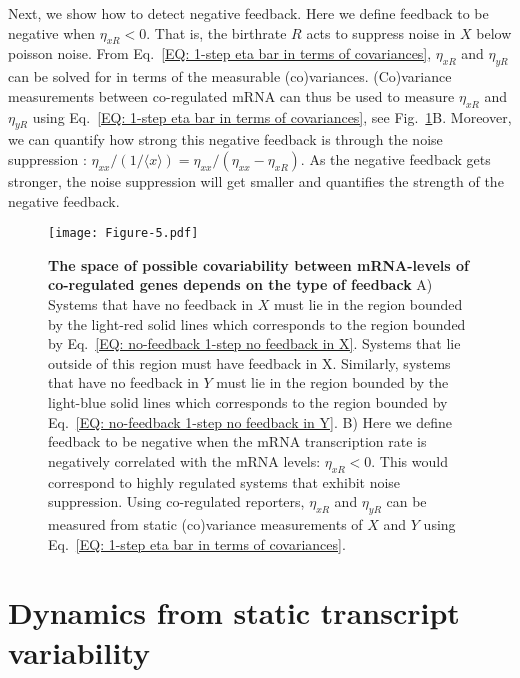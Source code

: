\documentclass[%
 reprint,prx,
superscriptaddress,
%
%
%
%
%
%
%
%
%
 amsmath,amssymb,
 aps,
%
%
%
%
%
%
]{revtex4-2}
\begin{document}
Next, we show how to detect negative feedback. Here we define feedback to be negative when $\eta_{xR} < 0$. That is, the birthrate $R$ acts to suppress noise in $X$
below poisson noise. From Eq.~\eqref{EQ: 1-step eta bar in terms of covariances}, $\eta_{xR}$ and $\eta_{yR}$ can be solved for in terms of the measurable (co)variances.
(Co)variance measurements between co-regulated mRNA can thus be used to measure $\eta_{xR}$ and $\eta_{yR}$ using Eq.~\eqref{EQ: 1-step eta bar in terms of covariances}, see Fig.~\ref{FIG: Types of feedback}B. Moreover, we can quantify how strong this negative feedback 
is through the noise suppression :
$\eta_{xx}/(1/\langle x \rangle) = \eta_{xx}/(\eta_{xx} - \eta_{xR})$.
As the negative feedback gets stronger, the noise suppression will get smaller and quantifies the strength of the negative feedback. 

\begin{figure}[hbt!]
\centering
  \texttt{[image: Figure-5.pdf]}
   \vspace{-.8em}
   \caption{
    \textbf{The space of possible covariability between mRNA-levels of co-regulated genes depends on the type of feedback} 
    A) Systems that have no feedback in $X$ must lie in the region bounded by the light-red solid lines which corresponds to the region 
    bounded by Eq.~\eqref{EQ: no-feedback 1-step no feedback in X}. Systems that lie outside of this region must have feedback in X. 
    Similarly, systems that have no feedback in $Y$ must lie in the region
    bounded by the light-blue solid lines which corresponds to the region 
    bounded by Eq.~\eqref{EQ: no-feedback 1-step no feedback in Y}. 
    B) Here we define feedback to be negative when the mRNA transcription rate is negatively correlated with the mRNA levels: $\eta_{xR} < 0$. 
    This would correspond to highly regulated systems that exhibit noise suppression. Using co-regulated reporters, $\eta_{xR}$ and 
    $\eta_{yR}$ can be measured from static (co)variance measurements of $X$ and $Y$ using Eq.~\eqref{EQ: 1-step eta bar in terms of covariances}.}
    \label{FIG: Types of feedback}
\end{figure}

\section{Dynamics from static transcript variability}\label{Appendix section on time-scales}
\end{document}
